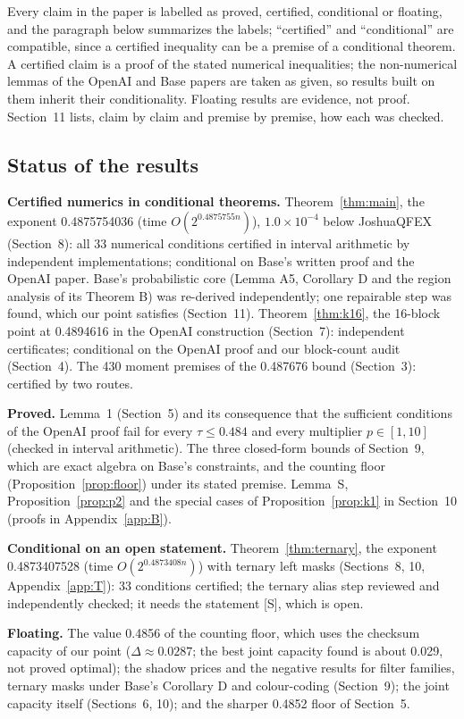\documentclass[11pt]{article}
\theoremstyle{plain}
\begin{document}
Every claim in the paper is labelled as proved, certified, conditional or floating, and the paragraph below summarizes the labels; ``certified'' and ``conditional'' are compatible, since a certified inequality can be a premise of a conditional theorem. A certified claim is a proof of the stated numerical inequalities; the non-numerical lemmas of the OpenAI and Base papers are taken as given, so results built on them inherit their conditionality. Floating results are evidence, not proof. Section~11 lists, claim by claim and premise by premise, how each was checked.

\subsection*{Status of the results}
\textbf{Certified numerics in conditional theorems.} Theorem~\ref{thm:main}, the exponent 0.4875754036 (time $O(2^{0.4875755n})$), $1.0\times10^{-4}$ below JoshuaQFEX (Section~8): all 33 numerical conditions certified in interval arithmetic by independent implementations; conditional on Base's written proof and the OpenAI paper. Base's probabilistic core (Lemma A5, Corollary D and the region analysis of its Theorem B) was re-derived independently; one repairable step was found, which our point satisfies (Section~11). Theorem~\ref{thm:k16}, the 16-block point at 0.4894616 in the OpenAI construction (Section~7): independent certificates; conditional on the OpenAI proof and our block-count audit (Section~4). The 430 moment premises of the 0.487676 bound (Section~3): certified by two routes.

\textbf{Proved.} Lemma~1 (Section~5) and its consequence that the sufficient conditions of the OpenAI proof fail for every $\tau \le 0.484$ and every multiplier $p \in [1, 10]$ (checked in interval arithmetic). The three closed-form bounds of Section~9, which are exact algebra on Base's constraints, and the counting floor (Proposition~\ref{prop:floor}) under its stated premise. Lemma~S, Proposition~\ref{prop:p2} and the special cases of Proposition~\ref{prop:k1} in Section~10 (proofs in Appendix~\ref{app:B}).

\textbf{Conditional on an open statement.} Theorem~\ref{thm:ternary}, the exponent 0.4873407528 (time $O(2^{0.4873408n})$) with ternary left masks (Sections~8, 10, Appendix~\ref{app:T}): 33 conditions certified; the ternary alias step reviewed and independently checked; it needs the statement [S], which is open.

\textbf{Floating.} The value 0.4856 of the counting floor, which uses the checksum capacity of our point ($\Delta \approx 0.0287$; the best joint capacity found is about 0.029, not proved optimal); the shadow prices and the negative results for filter families, ternary masks under Base's Corollary D and colour-coding (Section~9); the joint capacity itself (Sections~6, 10); and the sharper 0.4852 floor of Section~5.
\end{document}
